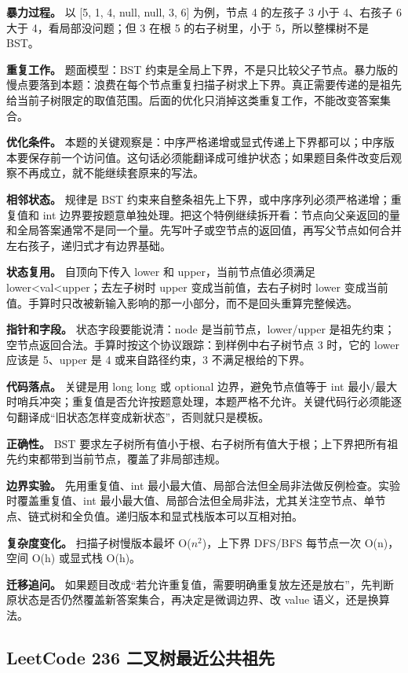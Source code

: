 \textbf{暴力过程。} 以 [5, 1, 4, null, null, 3, 6] 为例，节点 4 的左孩子 3 小于 4、右孩子 6 大于 4，看局部没问题；但 3 在根 5 的右子树里，小于 5，所以整棵树不是 BST。

\textbf{重复工作。} 题面模型：BST 约束是全局上下界，不是只比较父子节点。暴力版的慢点要落到本题：浪费在每个节点重复扫描子树求上下界。真正需要传递的是祖先给当前子树限定的取值范围。后面的优化只消掉这类重复工作，不能改变答案集合。

\textbf{优化条件。} 本题的关键观察是：中序严格递增或显式传递上下界都可以；中序版本要保存前一个访问值。这句话必须能翻译成可维护状态；如果题目条件改变后观察不再成立，就不能继续套原来的写法。

\textbf{相邻状态。} 规律是 BST 约束来自整条祖先上下界，或中序序列必须严格递增；重复值和 int 边界要按题意单独处理。把这个特例继续拆开看：节点向父亲返回的量和全局答案通常不是同一个量。先写叶子或空节点的返回值，再写父节点如何合并左右孩子，递归式才有边界基础。

\textbf{状态复用。} 自顶向下传入 lower 和 upper，当前节点值必须满足 lower<val<upper；去左子树时 upper 变成当前值，去右子树时 lower 变成当前值。手算时只改被新输入影响的那一小部分，而不是回头重算完整候选。

\textbf{指针和字段。} 状态字段要能说清：node 是当前节点，lower/upper 是祖先约束；空节点返回合法。手算时按这个协议跟踪：到样例中右子树节点 3 时，它的 lower 应该是 5、upper 是 4 或来自路径约束，3 不满足根给的下界。

\textbf{代码落点。} 关键是用 long long 或 optional 边界，避免节点值等于 int 最小/最大时哨兵冲突；重复值是否允许按题意处理，本题严格不允许。关键代码行必须能逐句翻译成“旧状态怎样变成新状态”，否则就只是模板。

\textbf{正确性。} BST 要求左子树所有值小于根、右子树所有值大于根；上下界把所有祖先约束都带到当前节点，覆盖了非局部违规。

\textbf{边界实验。} 先用重复值、int 最小最大值、局部合法但全局非法做反例检查。实验时覆盖重复值、int 最小最大值、局部合法但全局非法，尤其关注空节点、单节点、链式树和全负值。递归版本和显式栈版本可以互相对拍。

\textbf{复杂度变化。} 扫描子树慢版本最坏 O(\ensuremath{n^{2}})，上下界 DFS/BFS 每节点一次 O(n)，空间 O(h) 或显式栈 O(h)。

\textbf{迁移追问。} 如果题目改成“若允许重复值，需要明确重复放左还是放右”，先判断原状态是否仍然覆盖新答案集合，再决定是微调边界、改 value 语义，还是换算法。

\subsection{LeetCode 236 二叉树最近公共祖先}

